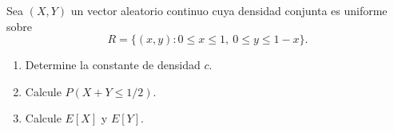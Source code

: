 Sea $(X,Y)$ un vector aleatorio continuo cuya densidad conjunta es uniforme sobre
\[
R=\{(x,y):0\leq x\leq1,\ 0\leq y\leq1-x\}.
\]
\begin{enumerate}
    \item Determine la constante de densidad $c$.
    \item Calcule $P(X+Y\leq1/2)$.
    \item Calcule $E[X]$ y $E[Y]$.
\end{enumerate}
